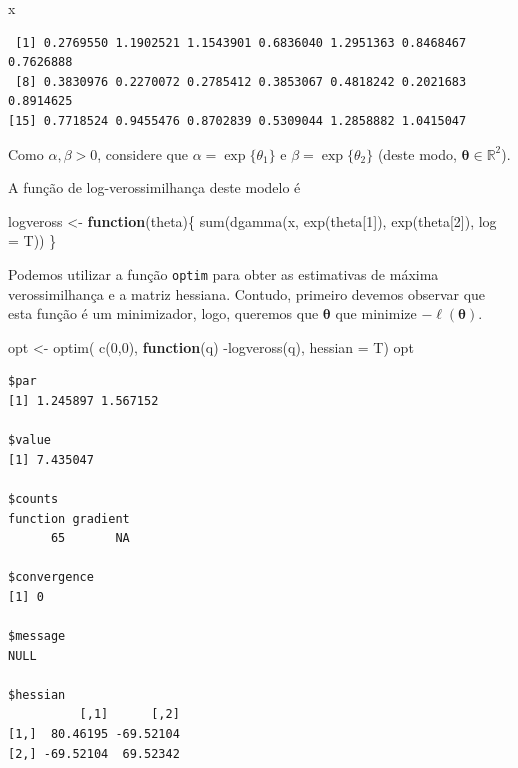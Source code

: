 \documentclass[
  letterpaper,
  DIV=11,
  numbers=noendperiod]{scrreprt}
\newenvironment{Shaded}{\begin{snugshade}}{\end{snugshade}}
\newcommand{\AttributeTok}[1]{\textcolor[rgb]{0.40,0.45,0.13}{#1}}
\newcommand{\ControlFlowTok}[1]{\textcolor[rgb]{0.00,0.23,0.31}{\textbf{#1}}}
\newcommand{\DecValTok}[1]{\textcolor[rgb]{0.68,0.00,0.00}{#1}}
\newcommand{\FunctionTok}[1]{\textcolor[rgb]{0.28,0.35,0.67}{#1}}
\newcommand{\NormalTok}[1]{\textcolor[rgb]{0.00,0.23,0.31}{#1}}
\newcommand{\OtherTok}[1]{\textcolor[rgb]{0.00,0.23,0.31}{#1}}
\newcommand{\SpecialCharTok}[1]{\textcolor[rgb]{0.37,0.37,0.37}{#1}}
\theoremstyle{definition}
\theoremstyle{definition}
\theoremstyle{plain}
\theoremstyle{remark}
\begin{document}
\begin{Shaded}
\begin{Highlighting}[]
\NormalTok{x}
\end{Highlighting}
\end{Shaded}

\begin{verbatim}
 [1] 0.2769550 1.1902521 1.1543901 0.6836040 1.2951363 0.8468467 0.7626888
 [8] 0.3830976 0.2270072 0.2785412 0.3853067 0.4818242 0.2021683 0.8914625
[15] 0.7718524 0.9455476 0.8702839 0.5309044 1.2858882 1.0415047
\end{verbatim}

Como \(\alpha,\beta>0\), considere que \(\alpha=\exp\{\theta_1\}\) e
\(\beta=\exp\{\theta_2\}\) (deste modo,
\(\boldsymbol{\theta}\in\mathbb{R}^2\)).

A função de log-verossimilhança deste modelo é

\begin{Shaded}
\begin{Highlighting}[]
\NormalTok{logveross }\OtherTok{\textless{}{-}} \ControlFlowTok{function}\NormalTok{(theta)\{ }\FunctionTok{sum}\NormalTok{(}\FunctionTok{dgamma}\NormalTok{(x, }\FunctionTok{exp}\NormalTok{(theta[}\DecValTok{1}\NormalTok{]), }\FunctionTok{exp}\NormalTok{(theta[}\DecValTok{2}\NormalTok{]), }\AttributeTok{log =}\NormalTok{ T))}
\NormalTok{\}}
\end{Highlighting}
\end{Shaded}

Podemos utilizar a função \texttt{optim} para obter as estimativas de
máxima verossimilhança e a matriz hessiana. Contudo, primeiro devemos
observar que esta função é um minimizador, logo, queremos que
\(\boldsymbol{\theta}\) que minimize \(-\ell({\boldsymbol{\theta}})\).

\begin{Shaded}
\begin{Highlighting}[]
\NormalTok{opt }\OtherTok{\textless{}{-}} \FunctionTok{optim}\NormalTok{( }\FunctionTok{c}\NormalTok{(}\DecValTok{0}\NormalTok{,}\DecValTok{0}\NormalTok{), }\ControlFlowTok{function}\NormalTok{(q) }\SpecialCharTok{{-}}\FunctionTok{logveross}\NormalTok{(q), }\AttributeTok{hessian =}\NormalTok{ T)}
\NormalTok{opt}
\end{Highlighting}
\end{Shaded}

\begin{verbatim}
$par
[1] 1.245897 1.567152

$value
[1] 7.435047

$counts
function gradient 
      65       NA 

$convergence
[1] 0

$message
NULL

$hessian
          [,1]      [,2]
[1,]  80.46195 -69.52104
[2,] -69.52104  69.52342
\end{verbatim}
\end{document}
